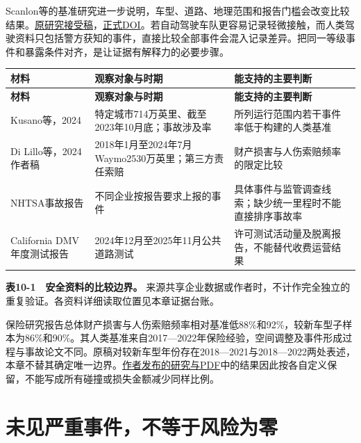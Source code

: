 \documentclass[UTF8,fontset=windows,12pt,a4paper,oneside,openany]{ctexbook}
\begin{document}
Scanlon等的基准研究进一步说明，车型、道路、地理范围和报告门槛会改变比较结果。\href{https://arxiv.org/html/2312.13228v2}{原研究接受稿}，\href{https://doi.org/10.1080/15389588.2024.2380522}{正式DOI}。若自动驾驶车队更容易记录轻微接触，而人类驾驶资料只包括警方获知的事件，直接比较全部事件会混入记录差异。把同一等级事件和暴露条件对齐，是让证据有解释力的必要步骤。

\begingroup\footnotesize\setlength{\tabcolsep}{4pt}\renewcommand{\arraystretch}{1.25}
\begin{longtable}{>{\raggedright\arraybackslash}p{}>{\raggedright\arraybackslash}p{}>{\raggedright\arraybackslash}p{}}
\toprule
\textbf{材料} & \textbf{观察对象与时期} & \textbf{能支持的主要判断} \\
\midrule\endfirsthead
\toprule
\textbf{材料} & \textbf{观察对象与时期} & \textbf{能支持的主要判断} \\
\midrule\endhead
\bottomrule\endfoot
Kusano等，2024 & 特定城市714万英里、截至2023年10月底；事故涉及率 & 所列运行范围内若干事件率低于构建的人类基准 \\
Di Lillo等，2024作者稿 & 2018年1月至2024年7月Waymo2530万英里；第三方责任索赔 & 财产损害与人伤索赔频率的限定比较 \\
NHTSA事故报告 & 不同企业按报告要求上报的事件 & 具体事件与监管调查线索；缺少统一里程时不能直接排序事故率 \\
California DMV年度测试报告 & 2024年12月至2025年11月公共道路测试 & 许可测试活动量及脱离报告，不能替代收费运营结果 \\
\end{longtable}\endgroup


\textbf{表10-1　安全资料的比较边界。} 来源共享企业数据或作者时，不计作完全独立的重复验证。各资料详细读取位置见本章证据台账。

保险研究报告总体财产损害与人伤索赔频率相对基准低88\%和92\%，较新车型子样本为86\%和90\%。其人类基准来自2017—2022年保险经验，空间调整及事件形成过程与事故论文不同。原稿对较新车型年份存在2018—2021与2018—2022两处表述，本章不替其确定唯一边界。\href{https://waymo.com/research/do-autonomous-vehicles-outperform-latest-generation-human-driven-vehicles-25-million-miles/}{作者发布的研究与PDF}中的结果因此按各自定义保留，不能写成所有碰撞或损失金额减少同样比例。

\section{未见严重事件，不等于风险为零}
\end{document}
